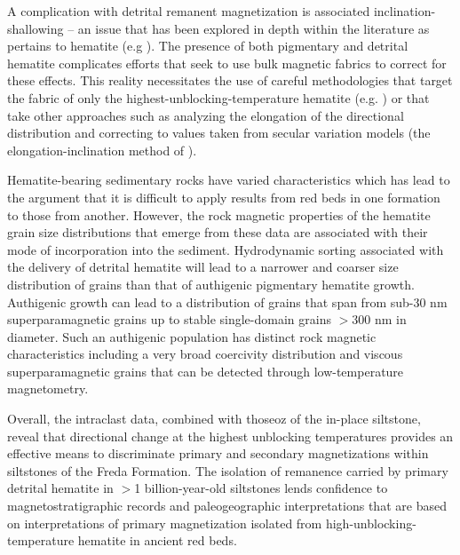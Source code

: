 \documentclass[draft]{agujournal2018}
\begin{document}
A complication with detrital remanent magnetization is associated inclination-shallowing -- an issue that has been explored in depth within the literature as pertains to hematite (e.g \citealp{Tauxe1984a, Bilardello2010a}). The presence of both pigmentary and detrital hematite complicates efforts that seek to use bulk magnetic fabrics to correct for these effects. This reality necessitates the use of careful methodologies that target the fabric of only the highest-unblocking-temperature hematite (e.g. \citealp{Bilardello2015a}) or that take other approaches such as analyzing the elongation of the directional distribution and correcting to values taken from secular variation models (the elongation-inclination method of \citealp{Tauxe2004a}).

 Hematite-bearing sedimentary rocks have varied characteristics which has lead to the argument that it is difficult to apply results from red beds in one formation to those from another. However, the rock magnetic properties of the hematite grain size distributions that emerge from these data are associated with their mode of incorporation into the sediment. Hydrodynamic sorting associated with the delivery of detrital hematite will lead to a narrower and coarser size distribution of grains than that of authigenic pigmentary hematite growth. Authigenic growth can lead to a distribution of grains that span from sub-30 nm superparamagnetic grains up to stable single-domain grains $>$300 nm in diameter. Such an authigenic population has distinct rock magnetic characteristics including a very broad coercivity distribution and viscous superparamagnetic grains that can be detected through low-temperature magnetometry. 
 
 Overall, the intraclast data, combined with thoseoz of the in-place siltstone, reveal that directional change at the highest unblocking temperatures provides an effective means to discriminate primary and secondary magnetizations within siltstones of the Freda Formation. The isolation of remanence carried by primary detrital hematite in $>$1 billion-year-old siltstones lends confidence to magnetostratigraphic records and paleogeographic interpretations that are based on interpretations of primary magnetization isolated from high-unblocking-temperature hematite in ancient red beds. 



\end{document}
